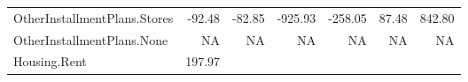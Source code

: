 \documentclass[]{article}
\begin{document}
\begin{longtable}[]{@{}lrrrrrr@{}}
\begin{minipage}[t]{0.31\columnwidth}
OtherInstallmentPlans.Stores\strut
\end{minipage} & \begin{minipage}[t]{0.10\columnwidth}\raggedleft\strut
-92.48\strut
\end{minipage} & \begin{minipage}[t]{0.08\columnwidth}\raggedleft\strut
-82.85\strut
\end{minipage} & \begin{minipage}[t]{0.08\columnwidth}\raggedleft\strut
-925.93\strut
\end{minipage} & \begin{minipage}[t]{0.08\columnwidth}\raggedleft\strut
-258.05\strut
\end{minipage} & \begin{minipage}[t]{0.08\columnwidth}\raggedleft\strut
87.48\strut
\end{minipage} & \begin{minipage}[t]{0.08\columnwidth}\raggedleft\strut
842.80\strut
\end{minipage}\tabularnewline
\begin{minipage}[t]{0.31\columnwidth}\raggedright\strut
OtherInstallmentPlans.None\strut
\end{minipage} & \begin{minipage}[t]{0.10\columnwidth}\raggedleft\strut
NA\strut
\end{minipage} & \begin{minipage}[t]{0.08\columnwidth}\raggedleft\strut
NA\strut
\end{minipage} & \begin{minipage}[t]{0.08\columnwidth}\raggedleft\strut
NA\strut
\end{minipage} & \begin{minipage}[t]{0.08\columnwidth}\raggedleft\strut
NA\strut
\end{minipage} & \begin{minipage}[t]{0.08\columnwidth}\raggedleft\strut
NA\strut
\end{minipage} & \begin{minipage}[t]{0.08\columnwidth}\raggedleft\strut
NA\strut
\end{minipage}\tabularnewline
\begin{minipage}[t]{0.31\columnwidth}\raggedright\strut
Housing.Rent\strut
\end{minipage} & \begin{minipage}[t]{0.10\columnwidth}\raggedleft\strut
197.97\strut
\end{minipage} & \begin{minipage}[t]{0.08\columnwidth}\raggedleft\strut

\end{minipage}
\end{longtable}
\end{document}
